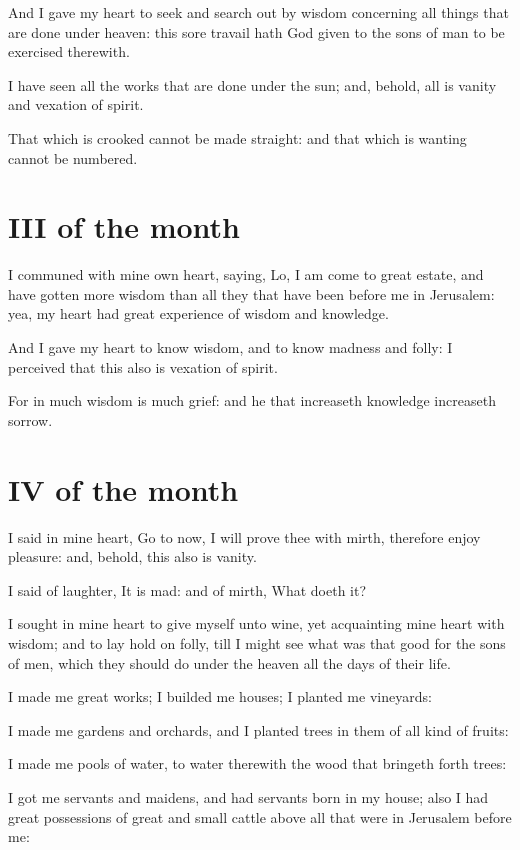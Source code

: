 \documentclass[0main.tex]{subfiles}
\begin{document}
And I gave my heart to seek and search out by wisdom concerning all things that are done under heaven: this sore travail hath God given to the sons of man to be exercised therewith.

I have seen all the works that are done under the sun; and, behold, all is vanity and vexation of spirit.

That which is crooked cannot be made straight: and that which is wanting cannot be numbered.

\section*{III of the month}

I communed with mine own heart, saying, Lo, I am come to great estate, and have gotten more wisdom than all they that have been before me in Jerusalem: yea, my heart had great experience of wisdom and knowledge.

And I gave my heart to know wisdom, and to know madness and folly: I perceived that this also is vexation of spirit.

For in much wisdom is much grief: and he that increaseth knowledge increaseth sorrow.

\section*{IV of the month}

I said in mine heart, Go to now, I will prove thee with mirth, therefore enjoy pleasure: and, behold, this also is vanity.

I said of laughter, It is mad: and of mirth, What doeth it?

I sought in mine heart to give myself unto wine, yet acquainting mine heart with wisdom; and to lay hold on folly, till I might see what was that good for the sons of men, which they should do under the heaven all the days of their life.

I made me great works; I builded me houses; I planted me vineyards:

I made me gardens and orchards, and I planted trees in them of all kind of fruits:

I made me pools of water, to water therewith the wood that bringeth forth trees:

I got me servants and maidens, and had servants born in my house; also I had great possessions of great and small cattle above all that were in Jerusalem before me:
\end{document}
